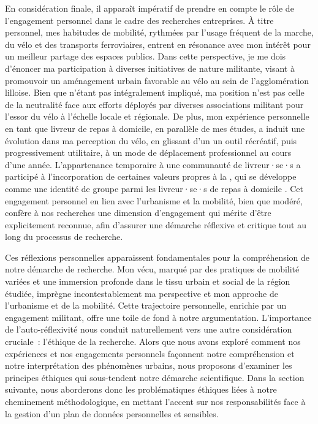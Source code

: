 \begin{refsegment}
En considération finale, il apparaît impératif de prendre en compte le rôle de l'engagement personnel dans le cadre des recherches entreprises. À titre personnel, mes habitudes de mobilité, rythmées par l'usage fréquent de la marche, du vélo et des transports ferroviaires, entrent en résonance avec mon intérêt pour un meilleur partage des espaces publics. Dans cette perspective, je me dois d'énoncer ma participation à diverses initiatives de nature militante, visant à promouvoir un aménagement urbain favorable au vélo au sein de l'agglomération lilloise. Bien que n'étant pas intégralement impliqué, ma position n'est pas celle de la neutralité face aux efforts déployés par diverses associations militant pour l'essor du vélo à l'échelle locale et régionale. De plus, mon expérience personnelle en tant que livreur de repas à domicile, en parallèle de mes études, a induit une évolution dans ma perception du vélo, en glissant d'un un outil récréatif, puis progressivement utilitaire, à un mode de déplacement professionnel au cours d'une année. L'appartenance temporaire à une communauté de livreur·se·s a participé à l'incorporation de certaines valeurs propres à la , qui se développe comme une identité de groupe parmi les livreur·se·s de repas à domicile \textcolor{blue}{\autocite[10]{jan_livrer_2018}}. Cet engagement personnel en lien avec l'urbanisme et la mobilité, bien que modéré, confère à nos recherches une dimension d'engagement qui mérite d'être explicitement reconnue, afin d'assurer une démarche réflexive et critique tout au long du processus de recherche.%

Ces réflexions personnelles apparaissent fondamentales pour la compréhension de notre démarche de recherche. Mon vécu, marqué par des pratiques de mobilité variées et une immersion profonde dans le tissu urbain et social de la région étudiée, imprègne incontestablement ma perspective et mon approche de l'urbanisme et de la mobilité. Cette trajectoire personnelle, enrichie par un engagement militant, offre une toile de fond à notre argumentation. L'importance de l'auto-réflexivité nous conduit naturellement vers une autre considération cruciale~: l'éthique de la recherche. Alors que nous avons exploré comment nos expériences et nos engagements personnels façonnent notre compréhension et notre interprétation des phénomènes urbains, nous proposons d'examiner les principes éthiques qui sous-tendent notre démarche scientifique. Dans la section suivante, nous aborderons donc les problématiques éthiques liées à notre cheminement méthodologique, en mettant l'accent sur nos responsabilités face à la gestion d'un plan de données personnelles et sensibles.%


\end{refsegment}
